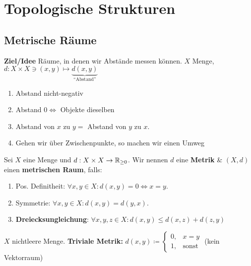 \section{Topologische Strukturen}
\subsection{Metrische Räume}
\textbf{Ziel/Idee} Räume, in denen wir Abstände messen können.
$ X $ Menge, $ d: X \times X \ni (x, y) \mapsto \underbrace{d(x, y)}_{\text{``Abstand''} } $ 
\begin{enumerate}[label=(\roman*)]
	\item Abstand nicht-negativ
	\item Abstand $ 0 \iff  $ Objekte dieselben
	\item Abstand von $ x $ zu $ y =  $ Abstand von $ y $ zu $ x $.
	\item Gehen wir über Zwischenpunkte, so machen wir einen Umweg
\end{enumerate}

\begin{subdefinition}
	Sei $ X $ eine Menge und $ d: X \times X \to \mathbb{R} _{\geq 0}  $. Wir nennen $ d $ eine \textbf{Metrik} \& $ (X, d) $ einen \textbf{metrischen Raum}, falls:
	\begin{enumerate}[label=(\alph*)]
		\item Pos. Definitheit: $ \forall x, y \in X: d(x, y) = 0 \iff x = y $.
		\item Symmetrie: $ \forall x, y \in X : d(x, y) = d(y, x) $.
		\item \textbf{Dreiecksungleichung}: $ \forall x, y, z \in X : d(x, y) \leq  d(x, z) + d(z, y) $
	\end{enumerate}
\end{subdefinition}

\begin{subexample}
	$ X $ nichtleere Menge. \textbf{Triviale Metrik:}
	$ d(x, y) \coloneqq \begin{cases}
		0, & x = y\\
		1, & \text{sonst} 
	\end{cases} $ 
	(kein Vektorraum)
\end{subexample}

